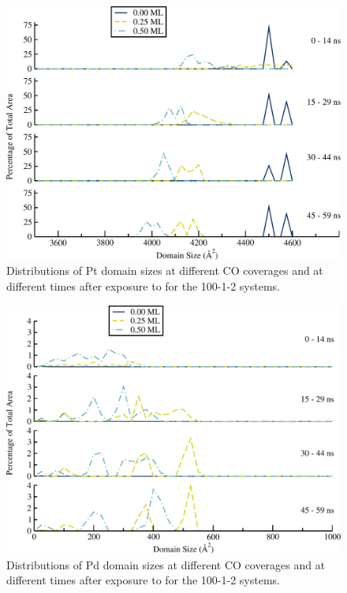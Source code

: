 \begin{figure}
\centering
  \includegraphics[width=\linewidth]{../figures/appC/ds_100_1Pt_2Pd_Pt.pdf}
  \caption{Distributions of Pt domain sizes at different CO coverages and at
different times after exposure to  for the 100-1-2
systems.}
\label{fig:ds100Pt}
\end{figure}


\begin{figure}
\centering
  \includegraphics[width=\linewidth]{../figures/appC/ds_100_1Pt_2Pd_Pd.pdf}
  \caption{Distributions of Pd domain sizes at different CO coverages and at
different times after exposure to  for the 100-1-2
systems.}
\label{fig:ds100Pd}
\end{figure}

